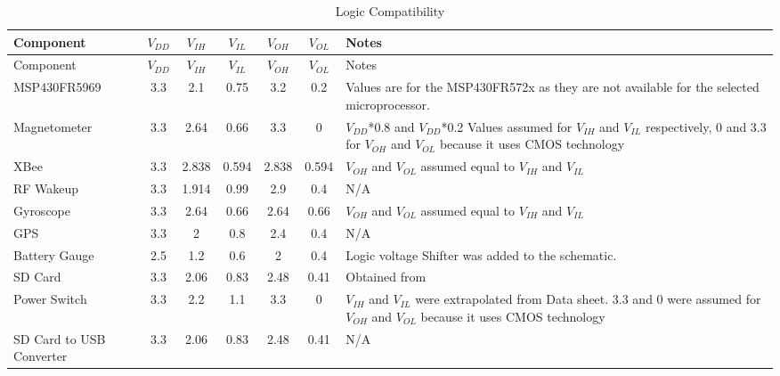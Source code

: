 \begin{center}

    \begin{longtable}{|p{1.2in}|c|c|c|c|c|p{1.8in}|}
    \caption{Logic Compatibility  \label{tab:logicComp}} \\
     \hline
    \rowcolor{Gray}
    Component & $V_{DD}$   & $V_{IH}$   & $V_{IL}$   & $V_{OH}$   & $V_{OL}$   & Notes \\
    \hline \hline \endfirsthead
    
         \hline
    \rowcolor{Gray}
    Component & $V_{DD}$   & $V_{IH}$   & $V_{IL}$   & $V_{OH}$   & $V_{OL}$   & Notes \\
    \hline \hline \endhead
    
    \endfoot

    MSP430FR5969 & 3.3   & 2.1   & 0.75  & 3.2   & 0.2   & Values are for the MSP430FR572x as they are not available for the selected microprocessor. \\ \hline
    Magnetometer & 3.3   & 2.64  & 0.66  & 3.3   & 0     & $V_{DD}$*0.8 and $V_{DD}$*0.2 Values assumed for $V_{IH}$ and $V_{IL}$ respectively, 0 and 3.3 for $V_{OH}$ and $V_{OL}$ because it uses CMOS technology \\ \hline
    XBee  & 3.3   & 2.838 & 0.594 & 2.838 & 0.594 & $V_{OH}$ and $V_{OL}$ assumed equal to $V_{IH}$ and $V_{IL}$ \\ \hline
    RF Wakeup & 3.3   & 1.914 & 0.99  & 2.9   & 0.4   & N/A \\ \hline
    Gyroscope & 3.3   & 2.64  & 0.66  & 2.64  & 0.66  & $V_{OH}$ and $V_{OL}$ assumed equal to $V_{IH}$ and $V_{IL}$ \\ \hline
    GPS   & 3.3   & 2     & 0.8   & 2.4   & 0.4   & N/A \\ \hline
    Battery Gauge & 2.5   & 1.2   & 0.6   & 2     & 0.4   & Logic voltage Shifter was added to the schematic. \\ \hline
    SD Card & 3.3 & 2.06   & 0.83   & 2.48   & 0.41  & Obtained from \cite{ibrahim2010sd} \\ \hline
    Power Switch & 3.3   & 2.2   & 1.1   & 3.3   & 0     & $V_{IH}$ and $V_{IL}$ were extrapolated from Data sheet. 3.3 and 0 were assumed for $V_{OH}$ and $V_{OL}$ because it uses CMOS technology \\ \hline
    SD Card to USB Converter & 3.3 & 2.06   & 0.83   & 2.48   & 0.41   & N/A \\ \hline
    \end{longtable}%
  
\end{center}%


